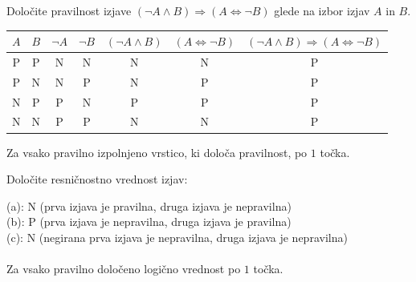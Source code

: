 \documentclass[addpoints]{exam}
\begin{document}
\begin{questions}

    
    \question[4]
    Določite pravilnost izjave $(\lnot A \land  B)\Rightarrow (A\Leftrightarrow \lnot B)$ glede na izbor izjav $A$ in $B$.

    \begin{solution}[11cm]
        \begin{table}[H]
            \begin{tabular}{ccccccc}
             $A$ & $B$ & $\lnot A$ & $\lnot B$ & $(\lnot A\land B)$ & $(A\Leftrightarrow \lnot B)$ & $(\lnot A\land B)\Rightarrow(A\Leftrightarrow \lnot B)$\\ \hline
             P & P & N & N & N & N & P \\ 
             P & N & N & P & N & P & P \\
             N & P & P & N & P & P & P \\
             N & N & P & P & N & N & P
            \end{tabular}
        \end{table}
        Za vsako pravilno izpolnjeno vrstico, ki določa pravilnost, po $1$ točka.
    \end{solution}




    \question[3]
    Določite resničnostno vrednost izjav:

    \begin{solution}
        (a): N (prva izjava je pravilna, druga izjava je nepravilna) \\
        (b): P (prva izjava je nepravilna, druga izjava je pravilna) \\
        (c): N (negirana prva izjava je nepravilna, druga izjava je nepravilna) \\ \\
        Za vsako pravilno določeno logično vrednost po $1$ točka.
    \end{solution}




\end{questions}
\end{document}
